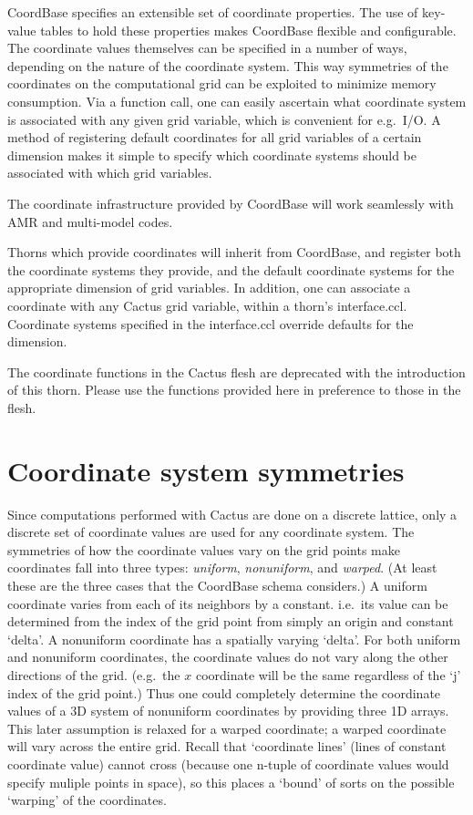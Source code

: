 CoordBase specifies an extensible set of coordinate properties.  The
use of key-value tables to hold these properties makes CoordBase
flexible and configurable.  The coordinate values themselves can be
specified in a number of ways, depending on the nature of the
coordinate system.  This way symmetries of the coordinates on the
computational grid can be exploited to minimize memory consumption.
Via a function call, one can easily ascertain what coordinate system is
associated with any given grid variable, which is convenient for e.g.\
I/O.  A method of registering default coordinates for all grid
variables of a certain dimension makes it simple to specify which
coordinate systems should be associated with which grid variables.

The coordinate infrastructure provided by CoordBase will work
seamlessly with AMR and multi-model codes.


Thorns which provide coordinates will inherit from CoordBase, and
register both the coordinate systems they provide, and the default
coordinate systems for the appropriate dimension of grid variables.
In addition, one can associate a coordinate with any Cactus grid
variable, within a thorn's interface.ccl.
Coordinate systems specified in the interface.ccl override defaults
for the dimension.

The coordinate functions in the Cactus flesh are deprecated with the
introduction of this thorn.  Please use the functions provided here in
preference to those in the flesh.


\section{Coordinate system symmetries}

Since computations performed with Cactus are done on a discrete
lattice, only a discrete set of coordinate values are used for any
coordinate system.  The symmetries of how the coordinate values vary
on the grid points make coordinates fall into three types:
\emph{uniform}, \emph{nonuniform}, and \emph{warped}.  (At least these
are the three cases that the CoordBase schema considers.)  A uniform
coordinate varies from each of its neighbors by a constant.  i.e.\ its
value can be determined from the index of the grid point from simply
an origin and constant `delta'.  A nonuniform coordinate has a
spatially varying `delta'.  For both uniform and nonuniform
coordinates, the coordinate values do not vary along the other
directions of the grid.  (e.g.\ the $x$ coordinate will be the same
regardless of the `j' index of the grid point.)  Thus one could
completely determine the coordinate values of a 3D system of
nonuniform coordinates by providing three 1D arrays.  This later
assumption is relaxed for a warped coordinate; a warped coordinate
will vary across the entire grid.  Recall that `coordinate lines'
(lines of constant coordinate value) cannot cross (because one n-tuple
of coordinate values would specify muliple points in space), so this
places a `bound' of sorts on the possible `warping' of the
coordinates.

